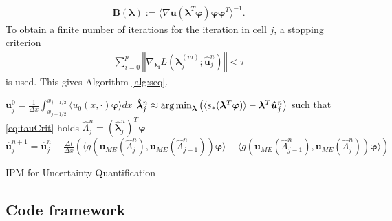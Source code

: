 \begin{align*}
\bm{B}(\bm{\lambda}) := \langle \nabla \bm{u} (\bm{\lambda}^T\bm{\varphi})\bm{\varphi}\bm{\varphi}^T\rangle^{-1}.
\end{align*}
To obtain a finite number of iterations for the iteration in cell $j$, a stopping criterion 
\begin{align}\label{eq:tauCrit}
\sum_{i=0}^p\left\Vert \nabla_{\bm{\lambda_i}}L(\bm{\lambda}_j^{(m)};\bm{\hat{u}}_j^n) \right\Vert < \tau
\end{align}
is used. This gives Algorithm \ref{alg:seq}.

\begin{algorithm}[H]
\begin{algorithmic}[1]
\STATE $\bm{u}_j^0 = \frac{1}{\Delta x} \int_{x_{j-1/ 2}}^{x_{j+1/ 2}} \langle u_0(x, \cdot) \bm{\varphi} \rangle dx$
\ENDFOR
{}
\STATE $\hat{\bm{\lambda}}_j^n \approx \operatorname*{arg\,min}_{\bm{\lambda}}  \left( \langle s_*(\bm{\lambda}^T \bm{\varphi})\rangle - \bm{\lambda}^T \bm{\hat u}_{j}^{n} \right)$
\hfill such that \eqref{eq:tauCrit} holds
\STATE $\hat \Lambda_j^n = \left(\hat{\bm{\lambda}}_j^n\right)^T\bm{\varphi}$
\ENDFOR
{}
\STATE $\bm{\hat u}_{j}^{n+1} = \bm{\hat u}_{j}^{n}- \frac{\Delta t}{\Delta x}\left( \langle g(\bm{u}_{ME}(\hat \Lambda_j^n),\bm{u}_{ME}(\hat \Lambda_{j+1}^n))\bm{\varphi}\rangle - \langle g(\bm{u}_{ME}(\hat \Lambda_{j-1}^n),\bm{u}_{ME}(\hat \Lambda_{j}^n))\bm{\varphi} \rangle\right)$ 
\ENDFOR
\ENDFOR
\end{algorithmic}
\caption{IPM for Uncertainty Quantification}
\label{alg:seq}
\end{algorithm}

\subsection{Code framework}